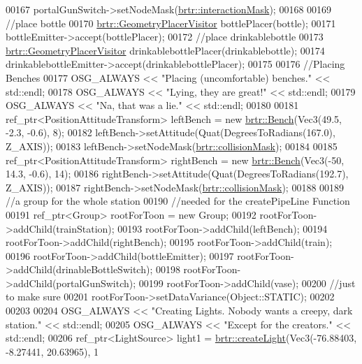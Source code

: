 \begin{DoxyCode}
00167     portalGunSwitch->setNodeMask(\hyperlink{namespacebrtr_a2060f4d70c0e3bc7e2e35f82e279a40d}{brtr::interactionMask});
00168 
00169     \textcolor{comment}{//place bottle}
00170     \hyperlink{classbrtr_1_1_geometry_placer_visitor}{brtr::GeometryPlacerVisitor} bottlePlacer(bottle);
00171     bottleEmitter->accept(bottlePlacer);
00172     \textcolor{comment}{//place drinkablebottle}
00173     \hyperlink{classbrtr_1_1_geometry_placer_visitor}{brtr::GeometryPlacerVisitor} drinkablebottlePlacer(drinkablebottle);
00174     drinkablebottleEmitter->accept(drinkablebottlePlacer);
00175 
00176     \textcolor{comment}{//Placing Benches}
00177     OSG\_ALWAYS << \textcolor{stringliteral}{"Placing (uncomfortable) benches."} << std::endl;
00178     OSG\_ALWAYS << \textcolor{stringliteral}{"Lying, they are great!"} << std::endl;
00179     OSG\_ALWAYS << \textcolor{stringliteral}{"Na, that was a lie."} << std::endl;
00180 
00181     ref\_ptr<PositionAttitudeTransform> leftBench = \textcolor{keyword}{new} \hyperlink{classbrtr_1_1_bench}{brtr::Bench}(Vec3(49.5, -2.3, -0.6), 8);
00182     leftBench->setAttitude(Quat(DegreesToRadians(167.0), Z\_AXIS));
00183     leftBench->setNodeMask(\hyperlink{namespacebrtr_af79a815819e2ef65ea9cd43dc9d43679}{brtr::collisionMask});
00184 
00185     ref\_ptr<PositionAttitudeTransform> rightBench = \textcolor{keyword}{new} \hyperlink{classbrtr_1_1_bench}{brtr::Bench}(Vec3(-50, 14.3, -0.6), 14);
00186     rightBench->setAttitude(Quat(DegreesToRadians(192.7), Z\_AXIS));
00187     rightBench->setNodeMask(\hyperlink{namespacebrtr_af79a815819e2ef65ea9cd43dc9d43679}{brtr::collisionMask});
00188 
00189     \textcolor{comment}{//a group for the whole station}
00190     \textcolor{comment}{//needed for the createPipeLine Function}
00191     ref\_ptr<Group> rootForToon = \textcolor{keyword}{new} Group;
00192     rootForToon->addChild(trainStation);
00193     rootForToon->addChild(leftBench);
00194     rootForToon->addChild(rightBench);
00195     rootForToon->addChild(train);
00196     rootForToon->addChild(bottleEmitter);
00197     rootForToon->addChild(drinableBottleSwitch);
00198     rootForToon->addChild(portalGunSwitch);
00199     rootForToon->addChild(vase);
00200     \textcolor{comment}{//just to make sure}
00201     rootForToon->setDataVariance(Object::STATIC);
00202 
00203 
00204     OSG\_ALWAYS << \textcolor{stringliteral}{"Creating Lights. Nobody wants a creepy, dark station."} << std::endl;
00205     OSG\_ALWAYS << \textcolor{stringliteral}{"Except for the creators."} << std::endl;
00206     ref\_ptr<LightSource> light1 = \hyperlink{namespacebrtr_ad772c6dbc0a2cabd40a284676c124a97}{brtr::createLight}(Vec3(-76.88403, -8.27441, 20.63965), 1

\end{DoxyCode}
